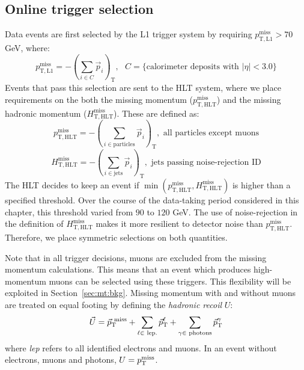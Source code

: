 \subsection{Online trigger selection}
\label{sec:mt:trigger}

Data events are first selected by the L1 trigger system by requiring $p_\mathrm{T,L1}^\mathrm{miss} > 70$ GeV, where:
\begin{equation}
    p_\mathrm{T,L1}^\mathrm{miss} = -\left(\sum_{i\in C} \vec{p}_i \right)_\mathrm{T}, \text{ $C = \{$calorimeter deposits with $|\eta|<3.0\}$}
\end{equation}
Events that pass this selection are sent to the HLT system, where we place requirements on the both the missing momentum ($p_\mathrm{T,HLT}^\mathrm{miss}$) and the missing hadronic momentum ($H_\mathrm{T,HLT}^\mathrm{miss}$).
These are defined as:
\begin{equation}
    p_\mathrm{T,HLT}^\mathrm{miss} = -\left(\sum_{i\in\mathrm{particles}} \vec{p}_i \right)_\mathrm{T}, \text{ all particles except muons}
\end{equation}
\begin{equation}
    H_\mathrm{T,HLT}^\mathrm{miss} = -\left(\sum_{i\in\mathrm{jets}} \vec{p}_i \right)_\mathrm{T}, \text{ jets passing noise-rejection ID}
\end{equation}
The HLT decides to keep an event if $\min(p_\mathrm{T,HLT}^\mathrm{miss}, H_\mathrm{T,HLT}^\mathrm{miss})$ is higher than a specified threshold.
Over the course of the data-taking period considered in this chapter, this threshold varied from $90$ to $120$ GeV.
The use of noise-rejection in the definition of $H_\mathrm{T,HLT}^\mathrm{miss}$ makes it more resilient to detector noise than $p_\mathrm{T,HLT}^\mathrm{miss}$.
Therefore, we place symmetric selections on both quantities.

Note that in all trigger decisions, muons are excluded from the missing momentum calculations.
This means that an event which produces high-momentum muons can be selected using these triggers.
This flexibility will be exploited in Section~\ref{sec:mt:bkg}. 
Missing momentum with and without muons are treated on equal footing by defining the \emph{hadronic recoil} $U$:
\begin{equation}
    \vec{U} = \vec{p}_\mathrm{T}^\mathrm{~miss} + \sum_{\ell\in\text{ lep.}} \vec{p}_\mathrm{T}^\ell + \sum_{\gamma\in\text{ photons}} \vec{p}_\mathrm{T}^\gamma
\end{equation}
where \emph{lep} refers to all identified electrons and muons.
In an event without electrons, muons and photons, $U = p_\mathrm{T}^\mathrm{miss}$.

